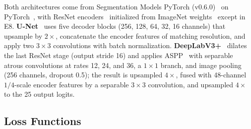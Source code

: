 Both architectures come from Segmentation Models PyTorch
(v0.6.0)~\cite{iakubovskii2019smp} on PyTorch~\cite{paszke2019pytorch}, with
ResNet encoders~\cite{he2016resnet} initialized from ImageNet
weights~\cite{deng2009imagenet} except in E8.
\textbf{U-Net}~\cite{ronneberger2015unet} uses five decoder blocks (256, 128, 64,
32, 16 channels) that upsample by $2\times$, concatenate the encoder features of
matching resolution, and apply two $3\times3$ convolutions with batch
normalization. \textbf{DeepLabV3+}~\cite{chen2018deeplabv3plus} dilates the last
ResNet stage (output stride 16) and applies ASPP~\cite{chen2017deeplabv3} with
separable atrous convolutions at rates 12, 24, and 36, a $1\times1$ branch, and
image pooling (256 channels, dropout 0.5); the result is upsampled $4\times$,
fused with 48-channel $1/4$-scale encoder features by a separable $3\times3$
convolution, and upsampled $4\times$ to the 25 output logits.

\subsection{Loss Functions}
\label{sec:losses}

